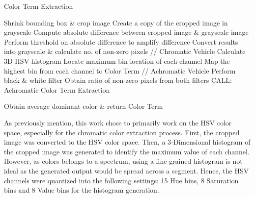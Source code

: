  
 \begin{algorithm}[!h]
  \caption{Color Term Extraction}
  \label{algo:colorExtract}
  \begin{algorithmic}[1]
        \State Shrink bounding box \& crop image
        \State Create a copy of the cropped image in grayscale
        \State Compute absolute difference between cropped image \& grayscale image
        \State Perform threshold on absolute difference to amplify difference
        \State Convert results into grayscale \& calculate no. of non-zero pixels
                \State // Chromatic Vehicle
                \State Calculate 3D HSV histogram  
                \State Locate maximum bin location of each channel
                \State Map the highest bin from each channel to Color Term
            \Else 
                \State // Achromatic Vehicle
                \State Perform black \& white filter 
                \State Obtain ratio of non-zero pixels from both filters
                \State CALL: Achromatic Color Term Extraction
            \EndIf

    \EndFor
    \State Obtain average dominant color \& return Color Term
  \end{algorithmic}
\end{algorithm}


As previously mention, this work chose to primarily work on the HSV color space, especially for the chromatic color extraction process. First, the cropped image was converted to the HSV color space. Then, a 3-Dimensional histogram of the cropped image was generated to identify the maximum value of each channel. However, as colors belongs to a spectrum, using a fine-grained histogram is not ideal as the generated output would be spread across a segment. Hence, the HSV channels were quantized into the following settings: 15 Hue bins, 8 Saturation bins and 8 Value bins for the histogram generation. 






